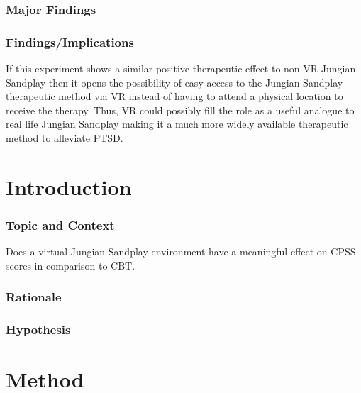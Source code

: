 \documentclass[
]{article}
\begin{document}
\hypertarget{major-findings}{%
\subsubsection{\texorpdfstring{\textbf{Major
Findings}}{Major Findings}}\label{major-findings}}

\hypertarget{findingsimplications}{%
\subsubsection{\texorpdfstring{\textbf{Findings/Implications}}{Findings/Implications}}\label{findingsimplications}}

If this experiment shows a similar positive therapeutic effect to non-VR
Jungian Sandplay then it opens the possibility of easy access to the
Jungian Sandplay therapeutic method via VR instead of having to attend a
physical location to receive the therapy. Thus, VR could possibly fill
the role as a useful analogue to real life Jungian Sandplay making it a
much more widely available therapeutic method to alleviate PTSD.

\hypertarget{introduction-1}{%
\section{Introduction}\label{introduction-1}}

\hypertarget{topic-and-context}{%
\subsubsection{\texorpdfstring{\textbf{Topic and
Context}}{Topic and Context}}\label{topic-and-context}}

Does a virtual Jungian Sandplay environment have a meaningful effect on
CPSS scores in comparison to CBT.

\hypertarget{rationale}{%
\subsubsection{\texorpdfstring{\textbf{Rationale}}{Rationale}}\label{rationale}}

\hypertarget{hypothesis}{%
\subsubsection{\texorpdfstring{\textbf{Hypothesis}}{Hypothesis}}\label{hypothesis}}

\hypertarget{method-1}{%
\section{Method}\label{method-1}}
\end{document}
